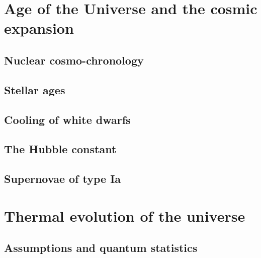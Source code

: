 

















\section{Age of the Universe and the cosmic expansion}
\subsection{Nuclear cosmo-chronology}
\subsection{Stellar ages}
\subsection{Cooling of white dwarfs}
\subsection{The Hubble constant}
\subsection{Supernovae of type Ia}




\section{Thermal evolution of the universe}
\subsection{Assumptions and quantum statistics}
